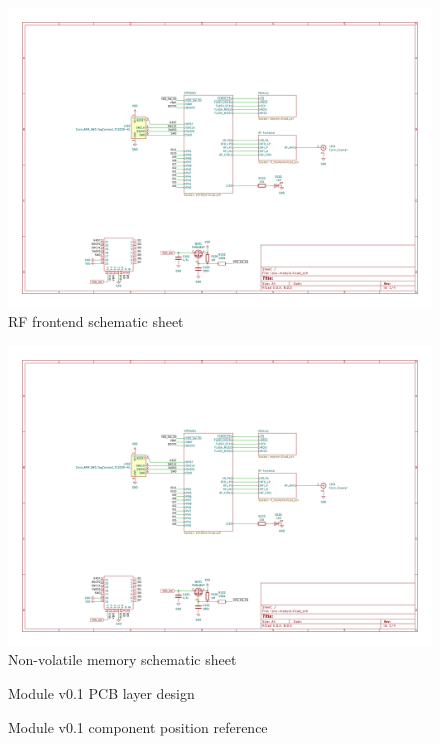 \begin{figure}
    \includegraphics[page=3,angle=-90,width=\textwidth]{boards/v0.1/lora-module.pdf}
    \caption{\label{schematic:v0.1-3}RF frontend schematic sheet}
\end{figure}
\begin{figure}
    \includegraphics[page=4,angle=-90,width=\textwidth]{boards/v0.1/lora-module.pdf}
    \caption{\label{schematic:v0.1-4}Non-volatile memory schematic sheet}
\end{figure}

\begin{figure}
    \hfill
    \hfill
    \hfill
    \caption{\label{board:v0.1}Module v0.1 PCB layer design}
\end{figure}

\begin{figure}
    
    \caption{\label{board:v0.1-components}Module v0.1 component position reference}
\end{figure}
